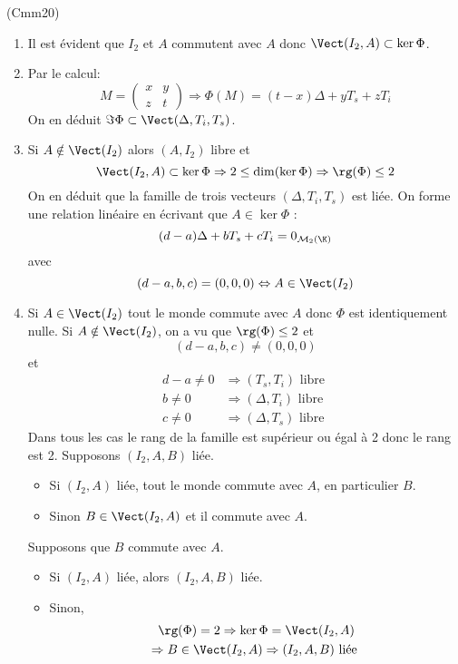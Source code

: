 \begin{tiny}(Cmm20)\end{tiny}
\begin{enumerate}
  \item Il est évident que $I_2$ et $A$ commutent avec $A$ donc $\Vect(I_2,A)\subset\ker \Phi$.
  \item Par le calcul:
\begin{displaymath}
M=
\begin{pmatrix}
x & y \\ z & t  
\end{pmatrix}
\Rightarrow 
\Phi(M) = (t-x)\Delta + yT_s + zT_i 
\end{displaymath}
On en déduit $\Im \Phi \subset \Vect(\Delta,T_i,T_s)$.

  \item Si $A\notin \Vect(I_2)$ alors $(A,I_2)$ libre et 
\begin{displaymath}
\Vect(I_2,A)\subset \ker \Phi \Rightarrow 2\leq \dim(\ker \Phi)
\Rightarrow \rg(\Phi) \leq 2
\end{displaymath}
On en déduit que la famille de trois vecteurs $(\Delta,T_i,T_s)$ est liée. On forme une relation linéaire en écrivant que $A\in \ker \Phi$ :
\begin{displaymath}
 (d-a)\Delta + bT_s + cT_i = 0_{\mathcal{M}_2(\K)} 
\end{displaymath}
avec
\begin{displaymath}
(d-a,b,c)=(0,0,0)\Leftrightarrow A \in \Vect(I_2)  
\end{displaymath}
 \item Si $A\in \Vect(I_2)$ tout le monde commute avec $A$ donc $\Phi$ est identiquement nulle.\newline
Si $A\notin \Vect(I_2)$, on a vu que $\rg(\Phi)\leq 2$ et 
\begin{displaymath}
(d-a,b,c)\neq(0,0,0)  
\end{displaymath}
et
\begin{align*}
d-a \neq 0 &\Rightarrow (T_s,T_i)\text{ libre } \\
b \neq 0 &\Rightarrow (\Delta,T_i)\text{ libre } \\
c \neq 0 &\Rightarrow (\Delta,T_s)\text{ libre } 
\end{align*}
Dans tous les cas le rang de la famille est supérieur ou égal à 2 donc le rang est 2.
Supposons $(I_2,A,B)$ liée.
\begin{itemize}
  \item Si $(I_2,A)$ liée, tout le monde commute avec $A$, en particulier $B$.
  \item Sinon $B\in \Vect(I_2,A)$ et il commute avec $A$.
\end{itemize}
Supposons que $B$ commute avec $A$.
\begin{itemize}
  \item Si $(I_2,A)$ liée, alors $(I_2,A,B)$ liée.
  \item Sinon,
\begin{multline*}
\rg(\Phi)=2 \Rightarrow \ker \Phi = \Vect(I_2,A) \\
\Rightarrow  B \in \Vect(I_2,A) \Rightarrow (I_2,A,B) \text{ liée }
\end{multline*}
\end{itemize}


\end{enumerate}
